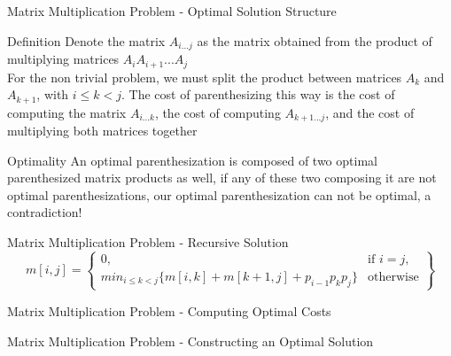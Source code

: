 \begin{frame}{Matrix Multiplication Problem - Optimal Solution Structure}
  \begin{block}{Definition}
   Denote the matrix $A_{i...j}$ as the matrix obtained from the product
   of multiplying matrices $A_{i}A_{i+1}...A_{j}$ \\
  \vspace{0.5em}
  For the non trivial problem, we must split the product between matrices $A_k$ and $A_{k+1}$,
  with $ i \leq k < j$. The cost of parenthesizing this way is the cost
  of computing the matrix $A_{i...k}$, the cost of computing $A_{k+1...j}$,
  and the cost of multiplying both matrices together
  \end{block}

  \pause
  \begin{alertblock}{Optimality}
    An optimal parenthesization is composed of two optimal parenthesized matrix products as well,
    if any of these two composing it are not optimal parenthesizations, our optimal parenthesization can not be optimal,
    a contradiction!
  \end{alertblock}
\end{frame}

\begin{frame}{Matrix Multiplication Problem - Recursive Solution}
    \[
    m[i,j] = \left\{\begin{array}{lr}
      0, & \text{if } i = j,\\
      min_{i \leq k < j} \{m[i,k] + m[k + 1, j] + p_{i-1}p_{k}p_{j}\} & \text{otherwise}
      \end{array}\right\}
    \]
  
\end{frame}

\begin{frame}{Matrix Multiplication Problem - Computing Optimal Costs}
  
\end{frame}

\begin{frame}{Matrix Multiplication Problem - Constructing an Optimal Solution}
  
\end{frame}